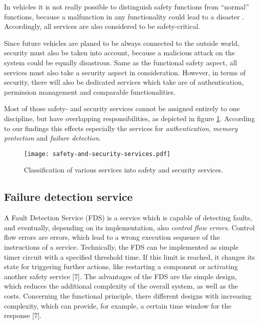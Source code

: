 In vehicles it is not really possible to distinguish safety functions from ``normal'' functions, because a malfunction in any functionality could lead to a disaster \cite{iso26262:course2}. Accordingly, all services are also considered to be safety-critical.

Since future vehicles are planed to be always connected to the outside world, security must also be taken into account, because a malicious attack on the system could be equally disastrous. Same as the functional safety aspect, all services must also take a security aspect in consideration. However, in terms of security, there will also be dedicated services which take are of authentication, permission management and comparable functionalities.

Most of those safety- and security services cannot be assigned entirely to one discipline, but have overlapping responsibilities, as depicted in figure \ref{fig:safety-and-security-services}. According to our findings this effects especially the services for \emph{authentication}, \emph{memory protection} and \emph{failure detection}.

\begin{figure}[!htbp]
\centering
\texttt{[image: safety-and-security-services.pdf]}
\caption{Classification of various services into safety and security services.}
\label{fig:safety-and-security-services}
\end{figure}




\subsection{Failure detection service}

A Fault Detection Service (FDS) is a service which is capable of detecting faults, and eventually, depending on its implementation, also \emph{control flow errors}. Control flow errors are errors, which lead to a wrong execution sequence of the instructions of a service.
Technically, the FDS can be implemented as simple timer circuit with a specified threshold time. If this limit is reached, it changes its state for triggering further actions, like restarting a component or activating another safety service [7].
The advantages of the FDS are the simple design, which reduces the additional complexity of the overall system, as well as the costs. Concerning the functional principle, there different designs with increasing complexity, which can provide, for example, a certain time window for the response [7].


